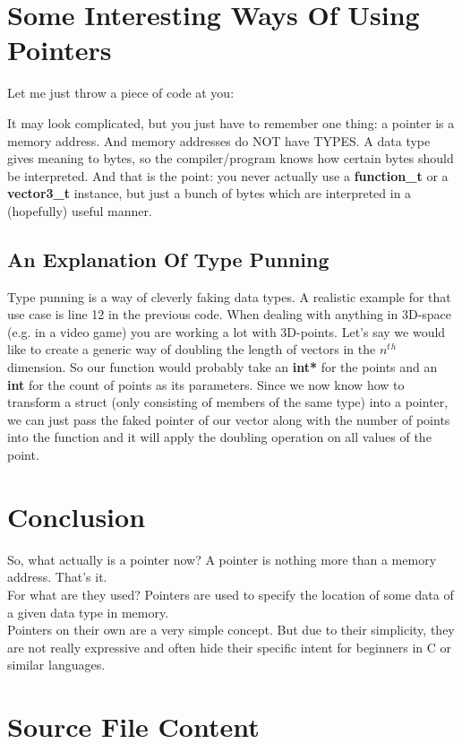 \documentclass{article}
\begin{document}
  \newpage
  \section{Some Interesting Ways Of Using Pointers}
  Let me just throw a piece of code at you:
  
  It may look complicated, but you just have to remember one thing: a pointer is a memory address.
  And memory addresses do NOT have TYPES.
  A data type gives meaning to bytes, so the compiler/program knows how certain bytes should be interpreted.
  And that is the point: you never actually use a \textbf{function\_t} or a \textbf{vector3\_t} instance, but just a bunch of bytes which are interpreted in a (hopefully) useful manner.
  \subsection{An Explanation Of Type Punning}
  Type punning is a way of cleverly faking data types.
  A realistic example for that use case is line 12 in the previous code.
  When dealing with anything in 3D-space (e.g. in a video game) you are working a lot with 3D-points.
  Let's say we would like to create a generic way of doubling the length of vectors in the $n^t$$^h$ dimension.
  So our function would probably take an \textbf{int*} for the points and an \textbf{int} for the count of points as its parameters.
  Since we now know how to transform a struct (only consisting of members of the same type) into a pointer, we can just pass the faked pointer of our vector along with the number of points into the function and it will apply the doubling operation on all values of the point.
  \newpage
  \section{Conclusion}
  So, what actually is a pointer now?
  A pointer is nothing more than a memory address.
  That's it.
  \\For what are they used?
  Pointers are used to specify the location of some data of a given data type in memory.
  \\Pointers on their own are a very simple concept.
  But due to their simplicity, they are not really expressive and often hide their specific intent for beginners in C or similar languages.
  
  
  \newpage
  \section{Source File Content}
  
  
\end{document}
